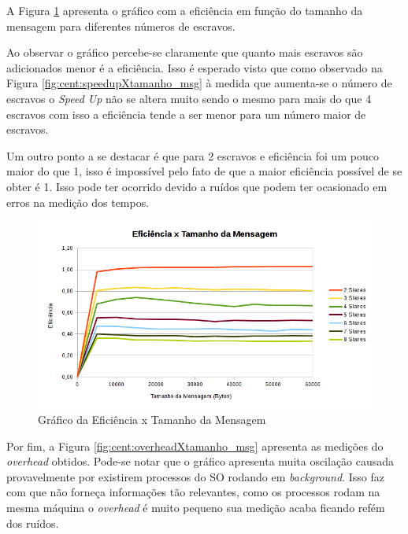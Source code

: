 \documentclass[
	12pt,				%
    oneside,			%
	a4paper,			%
	english,			%
	brazil,				%
	]{abntex2}
\begin{document}
A Figura \ref{fig:cent:eficienciaXtamanho_msg} apresenta o gráfico com a eficiência em função do tamanho da mensagem para 
diferentes números de escravos.

Ao observar o gráfico percebe-se claramente que quanto mais escravos são adicionados menor é a eficiência. Isso é esperado
visto que como observado na Figura \ref{fig:cent:speedupXtamanho_msg} à medida que aumenta-se o número de escravos o \textit{Speed Up} não se altera muito sendo o mesmo para mais do que 4 escravos com isso a eficiência tende a ser menor
para um número maior de escravos.

Um outro ponto a se destacar é que para 2 escravos e eficiência foi um pouco maior do que 1, isso é impossível pelo fato de
que a maior eficiência possível de se obter é 1. Isso pode ter ocorrido devido a ruídos que podem ter ocasionado em erros na
medição dos tempos.

\begin{figure}[!htb]
\centering
\includegraphics[scale=0.55]{figuras/eficiencia_centralizado.png}
\caption{Gráfico da Eficiência x Tamanho da Mensagem}
\label{fig:cent:eficienciaXtamanho_msg}
\end{figure}

Por fim, a Figura \ref{fig:cent:overheadXtamanho_msg} apresenta as medições do \textit{overhead} obtidos. Pode-se notar que 
o gráfico apresenta muita oscilação causada provavelmente por existirem processos do SO rodando em \textit{background}. Isso
faz com que não forneça informações tão relevantes, como os processos rodam na mesma máquina o \textit{overhead} é muito
pequeno sua medição acaba ficando refém dos ruídos.
\end{document}

